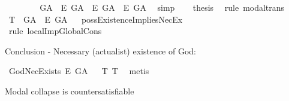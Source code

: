 \begin{isabellebody}
\ \ \isamarkupfalse%
\ {}\ {}\ \isamarkupfalse%
\ {\isachardoublequoteopen}{\isasymlfloor}\isactrlbold {\isasymdiamond}\isactrlbold {\isasymexists}\ G\isactrlsup A\ \isactrlbold {\isasymrightarrow}\ \isactrlbold {\isasymdiamond}\isactrlbold {\isasymbox}\isactrlbold {\isasymexists}\isactrlsup E\ G\isactrlsup A{\isasymrfloor}\ {\isasymand}\ {\isasymlfloor}\isactrlbold {\isasymdiamond}\isactrlbold {\isasymbox}\isactrlbold {\isasymexists}\isactrlsup E\ G\isactrlsup A\ \isactrlbold {\isasymrightarrow}\ \isactrlbold {\isasymbox}\isactrlbold {\isasymexists}\isactrlsup E\ G\isactrlsup A{\isasymrfloor}{\isachardoublequoteclose}\ \isamarkupfalse%
\ simp\isanewline
\ \ \isamarkupfalse%
\ {\isacharquery}thesis\ \isamarkupfalse%
\ {\isacharparenleft}rule\ modal{\isacharunderscore}trans{\isacharparenright}\isanewline
{}\isamarkupfalse%
%
%
\isanewline
%
\isanewline
{}\isamarkupfalse%
\ T{}{\isacharcolon}\ {\isachardoublequoteopen}{\isasymlfloor}\isactrlbold {\isasymdiamond}\isactrlbold {\isasymexists}\ G\isactrlsup A{\isasymrfloor}\ {\isasymlongrightarrow}\ {\isasymlfloor}\isactrlbold {\isasymbox}\isactrlbold {\isasymexists}\isactrlsup E\ G\isactrlsup A{\isasymrfloor}{\isachardoublequoteclose}%
\ %
%
\isamarkupfalse%
\ possExistenceImpliesNecEx\ \isanewline
\ \ \ \ \isamarkupfalse%
\ {\isacharparenleft}rule\ localImpGlobalCons{\isacharparenright}\ %
%
%
%
%
\begin{isamarkuptext}%
Conclusion - Necessary (actualist) existence of God:%
\end{isamarkuptext}\isamarkuptrue%
\isamarkupfalse%
\ GodNecExists{\isacharcolon}\ {\isachardoublequoteopen}{\isasymlfloor}\isactrlbold {\isasymbox}\isactrlbold {\isasymexists}\isactrlsup E\ G\isactrlsup A{\isasymrfloor}{\isachardoublequoteclose}%
\ %
%
\isamarkupfalse%
\ T{}\ T{}\ \isamarkupfalse%
\ metis%
%
%
%
\isamarkuptrue%
%
\begin{isamarkuptext}%
Modal collapse is countersatisfiable%
\end{isamarkuptext}\isamarkuptrue%
\isamarkupfalse%
\ {\isachardoublequoteopen}{\isasymlfloor}\isactrlbold {\isasymforall}{\isasymPhi}{\isachardot}{\isacharparenleft}{\isasymPhi}\ \isactrlbold {\isasymrightarrow}\ {\isacharparenleft}\isactrlbold {\isasymbox}\ {\isasymPhi}{\isacharparenright}{\isacharparenright}{\isasymrfloor}{\isachardoublequoteclose}\ \isamarkupfalse%

\end{isabellebody}
